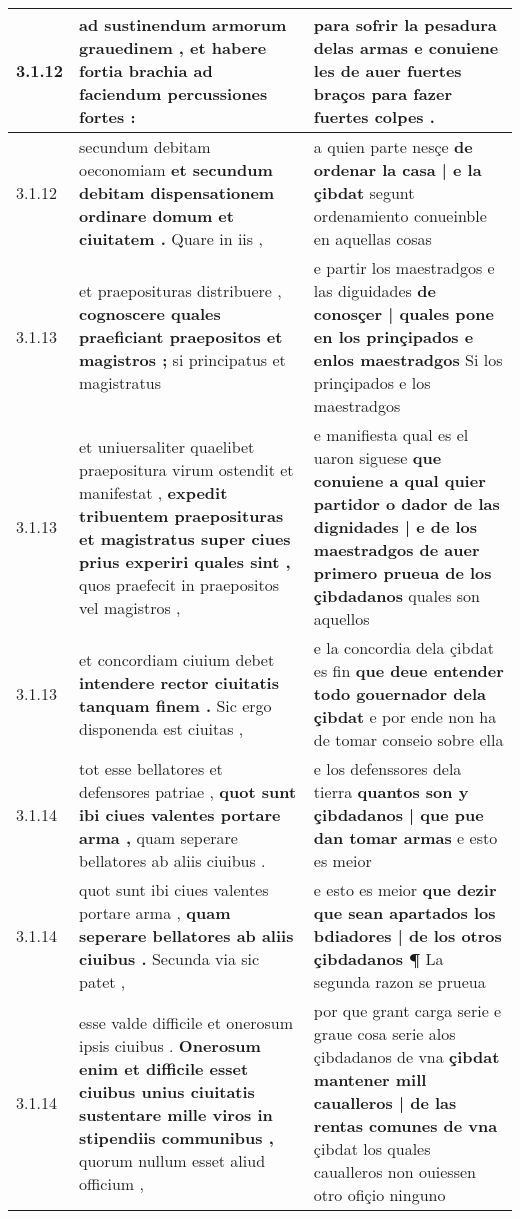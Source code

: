 \begin{tabular}{|p{1cm}|p{6.5cm}|p{6.5cm}|}
3.1.12 & ad sustinendum armorum grauedinem , \textbf{ et habere fortia brachia } ad faciendum percussiones fortes : & para sofrir la pesadura delas armas \textbf{ e conuiene les de auer fuertes braços } para fazer fuertes colpes . \\\hline
3.1.12 & secundum debitam oeconomiam \textbf{ et secundum debitam dispensationem ordinare domum et ciuitatem . } Quare in iis , & a quien parte nesçe \textbf{ de ordenar la casa | e la çibdat } segunt ordenamiento conueinble en aquellas cosas \\\hline
3.1.13 & et praeposituras distribuere , \textbf{ cognoscere quales praeficiant praepositos et magistros ; } si principatus et magistratus & e partir los maestradgos e las diguidades \textbf{ de conosçer | quales pone en los prinçipados e enlos maestradgos } Si los prinçipados e los maestradgos \\\hline
3.1.13 & et uniuersaliter quaelibet praepositura virum ostendit et manifestat , \textbf{ expedit tribuentem praeposituras et magistratus super ciues prius experiri quales sint , } quos praefecit in praepositos vel magistros , & e manifiesta qual es el uaron siguese \textbf{ que conuiene a qual quier partidor o dador de las dignidades | e de los maestradgos de auer primero prueua de los çibdadanos } quales son aquellos \\\hline
3.1.13 & et concordiam ciuium debet \textbf{ intendere rector ciuitatis tanquam finem . } Sic ergo disponenda est ciuitas , & e la concordia dela çibdat es fin \textbf{ que deue entender todo gouernador dela çibdat } e por ende non ha de tomar conseio sobre ella \\\hline
3.1.14 & tot esse bellatores et defensores patriae , \textbf{ quot sunt ibi ciues valentes portare arma , } quam seperare bellatores ab aliis ciuibus . & e los defenssores dela tierra \textbf{ quantos son y çibdadanos | que pue dan tomar armas } e esto es meior \\\hline
3.1.14 & quot sunt ibi ciues valentes portare arma , \textbf{ quam seperare bellatores ab aliis ciuibus . } Secunda via sic patet , & e esto es meior \textbf{ que dezir que sean apartados los bdiadores | de los otros çibdadanos ¶ } La segunda razon se prueua \\\hline
3.1.14 & esse valde difficile et onerosum ipsis ciuibus . \textbf{ Onerosum enim et difficile esset ciuibus unius ciuitatis sustentare mille viros in stipendiis communibus , } quorum nullum esset aliud officium , & por que grant carga serie e graue cosa serie alos çibdadanos de vna \textbf{ çibdat mantener mill caualleros | de las rentas comunes de vna } çibdat los quales caualleros non ouiessen otro ofiçio ninguno \\\hline

\end{tabular}
